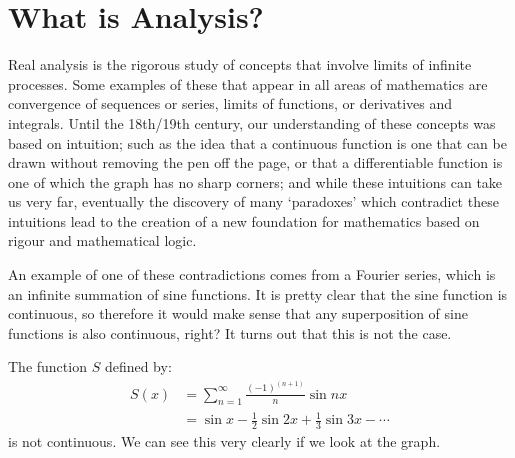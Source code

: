 \documentclass[../real_analysis.tex]{subfiles}
\begin{document}
    \section{What is Analysis?}\label{sec:what-is-analysis}
        Real analysis is the rigorous study of concepts that involve limits of infinite processes.
        Some examples of these that appear in all areas of mathematics are convergence of sequences or series, limits of functions, or derivatives and integrals.
        Until the 18th/19th century, our understanding of these concepts was based on intuition;
        such as the idea that a continuous function is one that can be drawn without removing the pen off the page, or that a differentiable function is one of which the graph has no sharp corners;
        and while these intuitions can take us very far, eventually the discovery of many `paradoxes' which contradict these intuitions lead to the creation of a new foundation for mathematics based on rigour and mathematical logic.

        An example of one of these contradictions comes from a Fourier series, which is an infinite summation of sine functions.
        It is pretty clear that the sine function is continuous, so therefore it would make sense that any superposition of sine functions is also continuous, right? It turns out that this is not the case.
        \begin{example}
            The function $S$ defined by:
            \begin{align}
                S(x) & = \sum_{n=1}^\infty\frac{(-1)^{(n+1)}}{n}\sin{nx}        \\
                    & = \sin{x}-\frac{1}{2}\sin{2x}+\frac{1}{3}\sin{3x}-\cdots
            \end{align}
            is not continuous. We can see this very clearly if we look at the graph.
        \end{example}
\end{document}
